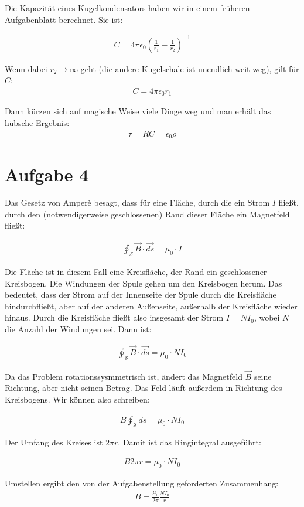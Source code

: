 \documentclass[a4paper,german,12pt,smallheadings]{scrartcl}
\begin{document}
Die Kapazität eines Kugelkondensators haben wir in einem früheren Aufgabenblatt berechnet. Sie ist:

\begin{align*}
  C = 4 \pi \epsilon_0 \left( \frac{1}{r_1} - \frac{1}{r_2} \right)^{-1}
\end{align*}

Wenn dabei $r_2 \to \infty$ geht (die andere Kugelschale ist unendlich weit weg), gilt für $C$:
\begin{align*}
  C = 4 \pi \epsilon_0 r_1
\end{align*}

Dann kürzen sich auf magische Weise viele Dinge weg und man erhält das hübsche
Ergebnis:
\begin{align*}
  \tau = RC = \epsilon_0 \rho
\end{align*}


\section*{Aufgabe 4}
Das Gesetz von Amperè besagt, dass für eine Fläche, durch die ein Strom $I$
fließt, durch den (notwendigerweise geschlossenen) Rand dieser Fläche ein
Magnetfeld fließt:

\begin{align*}
  \oint_{\mathcal{S}} \vec{B} \cdot \vec{ds} = \mu_0 \cdot I
\end{align*}

Die Fläche ist in diesem Fall eine Kreisfläche, der Rand ein geschlossener
Kreisbogen. Die Windungen der Spule gehen um den Kreisbogen herum. Das
bedeutet, dass der Strom auf der Innenseite der Spule durch die Kreisfläche
hindurchfließt, aber auf der anderen Außenseite, außerhalb der Kreisfläche
wieder hinaus. Durch die Kreisfläche fließt also insgesamt der Strom $I=NI_0$,
wobei $N$ die Anzahl der Windungen sei. Dann ist:

\begin{align*}
  \oint_{\mathcal{S}} \vec{B} \cdot \vec{ds} = \mu_0 \cdot NI_0
\end{align*}

Da das Problem rotationssysmmetrisch ist, ändert das Magnetfeld $\vec{B}$ seine
Richtung, aber nicht seinen Betrag. Das Feld läuft außerdem in Richtung des
Kreisbogens. Wir können also schreiben:

\begin{align*}
  B \oint_{\mathcal{S}} ds = \mu_0 \cdot NI_0
\end{align*}

Der Umfang des Kreises ist $2\pi r$. Damit ist das Ringintegral ausgeführt:

\begin{align*}
  B 2 \pi r = \mu_0 \cdot NI_0
\end{align*}

Umstellen ergibt den von der Aufgabenstellung geforderten Zusammenhang:
\begin{align*}
  B = \frac{\mu_0}{2 \pi} \frac{NI_0}{r}
\end{align*}
\end{document}
